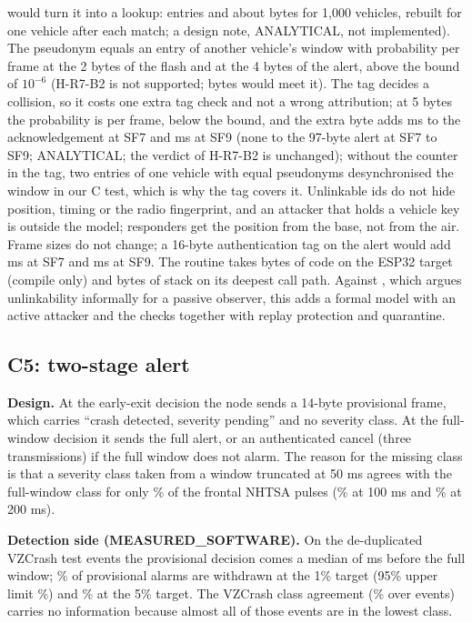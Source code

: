 \documentclass{ieeeaccess}
\begin{document}
would turn it into a lookup: \RsevbRebootEntries{} entries and about \RsevbRebootBytes{} bytes for 1,000 vehicles, rebuilt for one vehicle after each match; a design note, ANALYTICAL, not implemented). The pseudonym equals an entry of another vehicle's window with probability \RsevBtwoLTwo{} per frame at the 2 bytes of the flash and \RsevBtwoLFour{} at the 4 bytes of the alert, above the bound of $10^{-6}$ (H-R7-B2 is not supported; \RsevBtwoLMeet{} bytes would meet it). The tag decides a collision, so it costs one extra tag check and not a wrong attribution; at 5 bytes the probability is \RsevbCollFive{} per frame, below the bound, and the extra byte adds \RsevbExtraByteAckSeven{} ms to the acknowledgement at SF7 and \RsevbExtraByteAckNine{} ms at SF9 (none to the 97-byte alert at SF7 to SF9; ANALYTICAL; the verdict of H-R7-B2 is unchanged); without the counter in the tag, two entries of one vehicle with equal pseudonyms desynchronised the window in our C test, which is why the tag covers it. Unlinkable ids do not hide position, timing or the radio fingerprint, and an attacker that holds a vehicle key is outside the model; responders get the position from the base, not from the air. Frame sizes do not change; a 16-byte authentication tag on the alert would add \RsevAeadExtraSfSeven{} ms at SF7 and \RsevAeadExtraSfNine{} ms at SF9. The routine takes \RsevFpText{} bytes of code on the ESP32 target (compile only) and \RsevFpStack{} bytes of stack on its deepest call path. Against \cite{R7Pelissier2024}, which argues unlinkability informally for a passive observer, this adds a formal model with an active attacker and the checks together with replay protection and quarantine.

\subsection{C5: two-stage alert}
\label{sec:c5}
\textbf{Design.} At the early-exit decision the node sends a 14-byte provisional frame, which carries ``crash detected, severity pending'' and no severity class. At the full-window decision it sends the full alert, or an authenticated cancel (three transmissions) if the full window does not alarm. The reason for the missing class is that a severity class taken from a window truncated at 50 ms agrees with the full-window class for only \TThreeNhtsaFifty\% of the \TThreeNhtsaN{} frontal NHTSA pulses (\TThreeNhtsaHundred\% at 100 ms and \TThreeNhtsaTwo\% at 200 ms).

\textbf{Detection side (MEASURED\_SOFTWARE).} On the de-duplicated VZCrash test events the provisional decision comes a median of \TThreeEarlier{} ms before the full window; \TThreeRetract\% of provisional alarms are withdrawn at the 1\% target (95\% upper limit \TThreeRetractHi\%) and \TThreeFiveRetract\% at the 5\% target. The VZCrash class agreement (\TThreeVzClass\% over \TThreeVzN{} events) carries no information because almost all of those events are in the lowest class.
\end{document}
